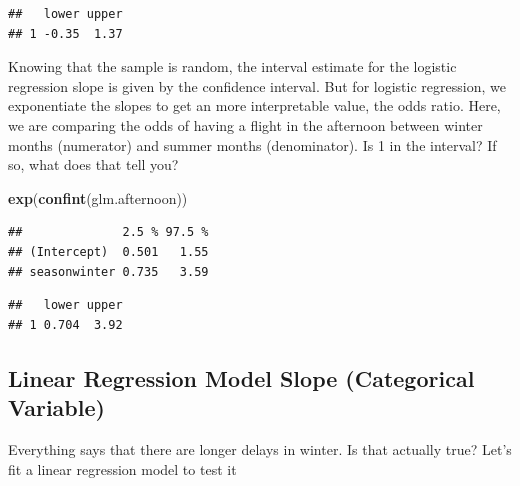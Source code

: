 \documentclass[]{book}
\newenvironment{Shaded}{\begin{snugshade}}{\end{snugshade}}
\newcommand{\DataTypeTok}[1]{\textcolor[rgb]{0.13,0.29,0.53}{#1}}
\newcommand{\DecValTok}[1]{\textcolor[rgb]{0.00,0.00,0.81}{#1}}
\newcommand{\KeywordTok}[1]{\textcolor[rgb]{0.13,0.29,0.53}{\textbf{#1}}}
\newcommand{\NormalTok}[1]{#1}
\newcommand{\OperatorTok}[1]{\textcolor[rgb]{0.81,0.36,0.00}{\textbf{#1}}}
\newcommand{\StringTok}[1]{\textcolor[rgb]{0.31,0.60,0.02}{#1}}
\begin{document}
\begin{verbatim}
##   lower upper
## 1 -0.35  1.37
\end{verbatim}

Knowing that the sample is random, the interval estimate for the logistic regression slope is given by the confidence interval. But for logistic regression, we exponentiate the slopes to get an more interpretable value, the odds ratio. Here, we are comparing the odds of having a flight in the afternoon between winter months (numerator) and summer months (denominator). Is 1 in the interval? If so, what does that tell you?

\begin{Shaded}
\begin{Highlighting}[]
\KeywordTok{exp}\NormalTok{(}\KeywordTok{confint}\NormalTok{(glm.afternoon))}
\end{Highlighting}
\end{Shaded}

\begin{verbatim}
##              2.5 % 97.5 %
## (Intercept)  0.501   1.55
## seasonwinter 0.735   3.59
\end{verbatim}

\begin{Shaded}
\end{Shaded}

\begin{verbatim}
##   lower upper
## 1 0.704  3.92
\end{verbatim}

\hypertarget{linear-regression-model-slope-categorical-variable}{%
\subsection{Linear Regression Model Slope (Categorical Variable)}\label{linear-regression-model-slope-categorical-variable}}

Everything says that there are longer delays in winter. Is that actually true? Let's fit a linear regression model to test it
\end{document}
